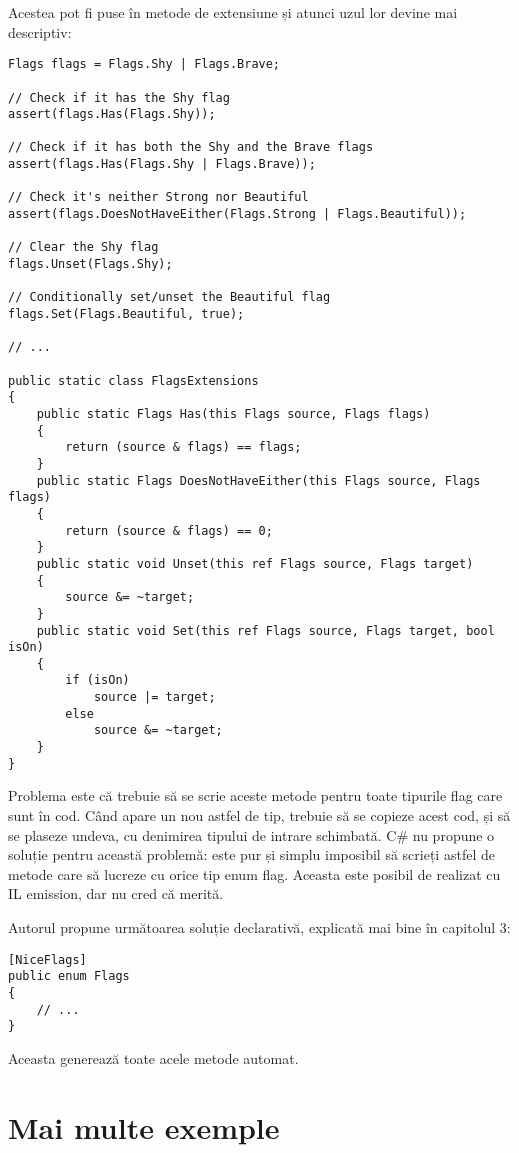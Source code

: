 \documentclass{report}
\begin{document}
Acestea pot fi puse în metode de extensiune și atunci uzul lor devine mai descriptiv:

\begin{lstlisting}
Flags flags = Flags.Shy | Flags.Brave;

// Check if it has the Shy flag
assert(flags.Has(Flags.Shy));

// Check if it has both the Shy and the Brave flags
assert(flags.Has(Flags.Shy | Flags.Brave));

// Check it's neither Strong nor Beautiful
assert(flags.DoesNotHaveEither(Flags.Strong | Flags.Beautiful));

// Clear the Shy flag
flags.Unset(Flags.Shy);

// Conditionally set/unset the Beautiful flag
flags.Set(Flags.Beautiful, true);

// ...

public static class FlagsExtensions
{
    public static Flags Has(this Flags source, Flags flags)
    {
        return (source & flags) == flags;
    }
    public static Flags DoesNotHaveEither(this Flags source, Flags flags)
    {
        return (source & flags) == 0;
    }
    public static void Unset(this ref Flags source, Flags target)
    {
        source &= ~target;
    }
    public static void Set(this ref Flags source, Flags target, bool isOn)
    {
        if (isOn)
            source |= target;
        else
            source &= ~target;
    }
}
\end{lstlisting}

Problema este că trebuie să se scrie aceste metode pentru toate tipurile flag care sunt în cod.
Când apare un nou astfel de tip, trebuie să se copieze acest cod, și să se plaseze undeva, cu denimirea tipului de intrare schimbată.
C# nu propune o soluție pentru această problemă: este pur și simplu imposibil să scrieți astfel de metode care să lucreze cu orice tip enum flag.
Aceasta este posibil de realizat cu IL emission, dar nu cred că merită.

Autorul propune următoarea soluție declarativă, explicată mai bine în capitolul 3:

\begin{lstlisting}
[NiceFlags]
public enum Flags
{
    // ...
}
\end{lstlisting}

Aceasta generează toate acele metode automat.

\section{Mai multe exemple}
\end{document}
